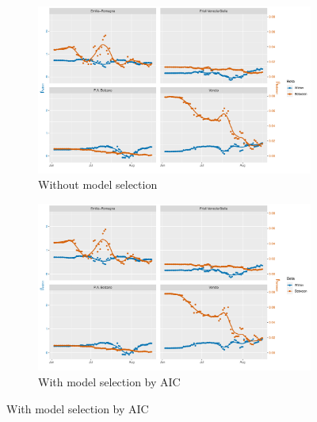 \documentclass[12pt]{article}
\begin{document}
    \begin{figure}[H]
	    \centering
	    \begin{subfigure}{\textwidth}
	      \centering
	      \includegraphics[width=0.95\linewidth]{output/model3_lag3_betas_Nord-Est_rolling.pdf}
	      \caption{Without model selection}
	      \label{fig:beta_within_between_over_time_nordest_regular}
	    \end{subfigure}\newline
	    \begin{subfigure}{\textwidth}
	      \centering
	      \includegraphics[width=0.95\linewidth]{output/model3_lag3_betas_Nord-Est_aic_rolling.pdf}
	      \caption{With model selection by AIC}
	      \label{fig:beta_within_between_over_time_nordest_aic}
	    \end{subfigure}
	\end{figure}
\end{document}
